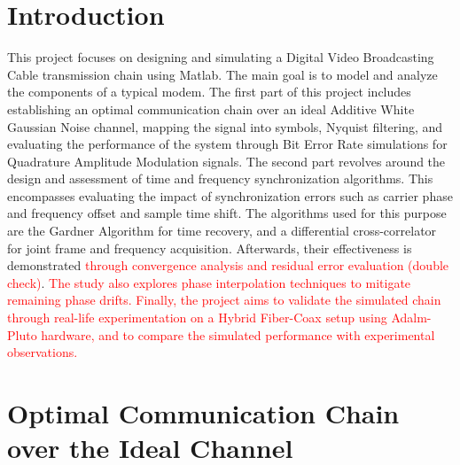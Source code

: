 \documentclass[11pt]{article}
\begin{document}
	\justifying
	
	
	\tableofcontents
	\newpage
	\listoffigures
	
	\newpage
	\section*{Introduction}{}
	This project focuses on designing and simulating a Digital Video Broadcasting Cable transmission chain using Matlab.
	The main goal is to model and analyze the components of a typical modem. The first part of this project includes establishing an optimal communication chain over an ideal Additive White Gaussian Noise channel, mapping the signal into symbols, Nyquist filtering, and evaluating the performance of the system through Bit Error Rate simulations for Quadrature Amplitude Modulation signals. The second part revolves around the design and assessment of time and frequency synchronization algorithms. This encompasses evaluating the impact of synchronization errors such as carrier phase and frequency offset and sample time shift. The algorithms used for this purpose are the Gardner Algorithm for time recovery, and a differential cross-correlator for joint frame and frequency acquisition. Afterwards, their effectiveness is demonstrated \textcolor{red}{through convergence analysis and residual error evaluation (double check)}. \textcolor{red}{The study also explores phase interpolation techniques to mitigate remaining phase drifts. Finally, the project aims to validate the simulated chain through real-life experimentation on a Hybrid Fiber-Coax setup using Adalm-Pluto hardware, and to compare the simulated performance with experimental observations.}
	
	
	\section{Optimal Communication Chain over the Ideal Channel}
\end{document}
